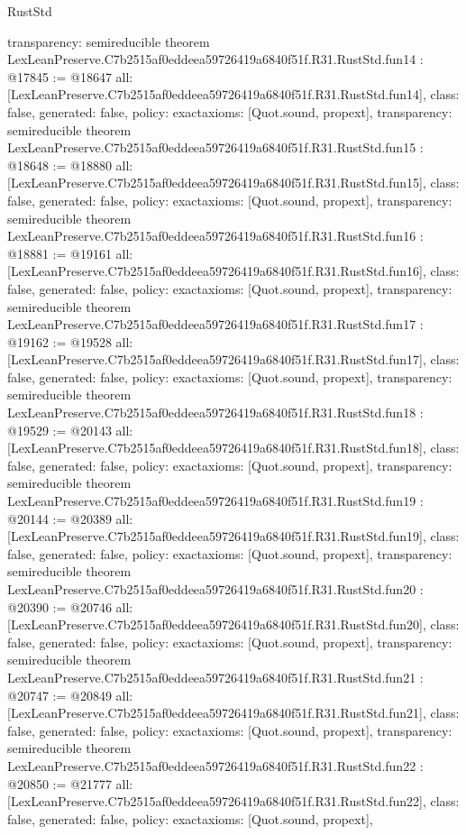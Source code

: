 \begin{lexlean}{RustStd}
\begin{coremodule}
{  transparency: semireducible
}
theorem LexLeanPreserve.C7b2515af0eddeea59726419a6840f51f.R31.RustStd.fun14 : @17845 := @18647 {
  all: [LexLeanPreserve.C7b2515af0eddeea59726419a6840f51f.R31.RustStd.fun14],
  class: false,
  generated: false,
  policy: exact{axioms: [Quot.sound, propext]},
  transparency: semireducible
}
theorem LexLeanPreserve.C7b2515af0eddeea59726419a6840f51f.R31.RustStd.fun15 : @18648 := @18880 {
  all: [LexLeanPreserve.C7b2515af0eddeea59726419a6840f51f.R31.RustStd.fun15],
  class: false,
  generated: false,
  policy: exact{axioms: [Quot.sound, propext]},
  transparency: semireducible
}
theorem LexLeanPreserve.C7b2515af0eddeea59726419a6840f51f.R31.RustStd.fun16 : @18881 := @19161 {
  all: [LexLeanPreserve.C7b2515af0eddeea59726419a6840f51f.R31.RustStd.fun16],
  class: false,
  generated: false,
  policy: exact{axioms: [Quot.sound, propext]},
  transparency: semireducible
}
theorem LexLeanPreserve.C7b2515af0eddeea59726419a6840f51f.R31.RustStd.fun17 : @19162 := @19528 {
  all: [LexLeanPreserve.C7b2515af0eddeea59726419a6840f51f.R31.RustStd.fun17],
  class: false,
  generated: false,
  policy: exact{axioms: [Quot.sound, propext]},
  transparency: semireducible
}
theorem LexLeanPreserve.C7b2515af0eddeea59726419a6840f51f.R31.RustStd.fun18 : @19529 := @20143 {
  all: [LexLeanPreserve.C7b2515af0eddeea59726419a6840f51f.R31.RustStd.fun18],
  class: false,
  generated: false,
  policy: exact{axioms: [Quot.sound, propext]},
  transparency: semireducible
}
theorem LexLeanPreserve.C7b2515af0eddeea59726419a6840f51f.R31.RustStd.fun19 : @20144 := @20389 {
  all: [LexLeanPreserve.C7b2515af0eddeea59726419a6840f51f.R31.RustStd.fun19],
  class: false,
  generated: false,
  policy: exact{axioms: [Quot.sound, propext]},
  transparency: semireducible
}
theorem LexLeanPreserve.C7b2515af0eddeea59726419a6840f51f.R31.RustStd.fun20 : @20390 := @20746 {
  all: [LexLeanPreserve.C7b2515af0eddeea59726419a6840f51f.R31.RustStd.fun20],
  class: false,
  generated: false,
  policy: exact{axioms: [Quot.sound, propext]},
  transparency: semireducible
}
theorem LexLeanPreserve.C7b2515af0eddeea59726419a6840f51f.R31.RustStd.fun21 : @20747 := @20849 {
  all: [LexLeanPreserve.C7b2515af0eddeea59726419a6840f51f.R31.RustStd.fun21],
  class: false,
  generated: false,
  policy: exact{axioms: [Quot.sound, propext]},
  transparency: semireducible
}
theorem LexLeanPreserve.C7b2515af0eddeea59726419a6840f51f.R31.RustStd.fun22 : @20850 := @21777 {
  all: [LexLeanPreserve.C7b2515af0eddeea59726419a6840f51f.R31.RustStd.fun22],
  class: false,
  generated: false,
  policy: exact{axioms: [Quot.sound, propext]},
}
\end{coremodule}
\end{lexlean}
